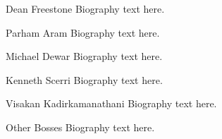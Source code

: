 \documentclass[onecolumn,draftcls]{IEEEtran}
\begin{document}
\ifCLASSOPTIONcaptionsoff
  \newpage
\fi








%

\begin{IEEEbiography}{Dean Freestone}
Biography text here.
\end{IEEEbiography}

\begin{IEEEbiography}{Parham Aram}
Biography text here.
\end{IEEEbiography}


\begin{IEEEbiography}{Michael Dewar}
Biography text here.
\end{IEEEbiography}

\begin{IEEEbiography}{Kenneth Scerri}
Biography text here.
\end{IEEEbiography}

\begin{IEEEbiography}{Visakan Kadirkamanathani}
Biography text here.
\end{IEEEbiography}

\begin{IEEEbiography}{Other Bosses}
Biography text here.
\end{IEEEbiography}

\end{document}
